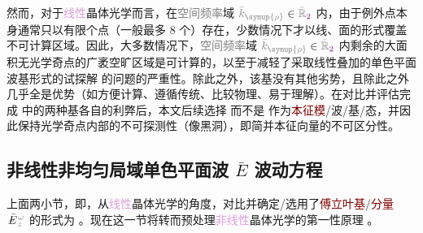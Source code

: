 然而，对于\textcolor{Plum}{线性}\textcolor{PineGreen}{晶体光学}而言，在\textcolor{gray}{空间频率}域 $\mathcolor{gray}{\bar{k}_{\symup{\rho}}} \in \mathcolor{gray}{\bar{\mathbb{R}}_{\textcolor{Plum}{2}}}$ 内，由于\textcolor{PineGreen}{例外点}本身通常只以有限个点（一般最多 8 个\cite{berryOpticalSingularitiesBirefringent2003,berryOpticalSingularitiesBianisotropic2005,sturmPropagationElectromagneticWaves,sturmSingularOpticalAxes2016a,grundmannOpticallyAnisotropicMedia2017}）存在，少数情况下才以线、面的形式覆盖不可计算区域\cite{xieAnalytic3DVector}。因此，大多数情况下，\textcolor{gray}{空间频率}域 $\mathcolor{gray}{\bar{k}_{\symup{\rho}}} \in \mathcolor{gray}{\bar{\mathbb{R}}_{\textcolor{Plum}{2}}}$ 内剩余的大面积无\textcolor{PineGreen}{光学奇点}的广袤空旷区域是可计算的，以至于减轻了采取\textcolor{PineGreen}{线性叠加的单色平面波基}形式的试探解  的问题的严重性。除此之外，该基没有其他劣势，且除此之外几乎全是优势（如方便计算、遵循传统、比较\textcolor{NavyBlue}{物理}、易于理解）。在对比并评估完成  中的两种基各自的利弊后，本文后续选择  而不是  作为\textcolor{Maroon}{本征模}/波/基/态，并因此保持\textcolor{PineGreen}{光学奇点}内部的不可探测性（像黑洞），即简并\textcolor{PineGreen}{本征向量}的不可区分性。


\vspace*{-4.5em}

\subsection{非线性非均匀局域单色平面波 $\bar{E}$ 波动方程}\label{ssec:E-waveq-nonlinear}

上面两小节，即，从\textcolor{Plum}{线性}\textcolor{PineGreen}{晶体光学}的角度，对比并确定/选用了\textcolor{Maroon}{傅立叶基}/\textcolor{Maroon}{分量} $\Xint{\mathcolor{gray}{-}}{25}{\bar{E}}^{\;\!\mathcolor{gray}{\omega}}_{\;\! \mathcolor{gray}{z}}$ 的形式为 。现在这一节将转而预处理\textcolor{Plum}{非线性}\textcolor{PineGreen}{晶体光学}的第一性原理 。

